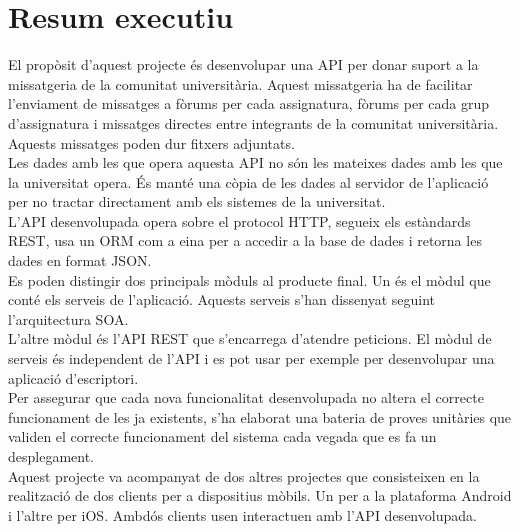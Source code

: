 
\chapter{Resum executiu}
El propòsit d'aquest projecte és desenvolupar una \ac{API} per donar suport a la missatgeria de la comunitat universitària. Aquest missatgeria ha de facilitar l'enviament de missatges a fòrums per cada assignatura, fòrums per cada grup d'assignatura i missatges directes entre integrants de la comunitat universitària. Aquests missatges poden dur fitxers adjuntats. \\

Les dades amb les que opera aquesta \ac{API} no són les mateixes dades amb les que la universitat opera. És manté una còpia de les dades al servidor de l'aplicació per no tractar directament amb els sistemes de la universitat.\\

L'\ac{API} desenvolupada opera sobre el protocol \ac{HTTP}, segueix els estàndards \ac{REST}, usa un \ac{ORM} com a eina per a accedir a la base de dades i retorna les dades en format \ac{JSON}. \\

Es poden distingir dos principals mòduls al producte final. Un és el mòdul que conté els serveis de l'aplicació. Aquests serveis s'han dissenyat seguint l'arquitectura \ac{SOA}. \\

L'altre mòdul és l'\ac{API} \ac{REST} que s'encarrega d'atendre peticions. El mòdul de serveis és independent de l'\ac{API} i es pot usar per exemple per desenvolupar una aplicació d'escriptori.\\

Per assegurar que cada nova funcionalitat desenvolupada no altera el correcte funcionament de les ja existents, s'ha elaborat una bateria de proves unitàries que validen el correcte funcionament del sistema cada vegada que es fa un desplegament.\\

Aquest projecte va acompanyat de dos altres projectes que consisteixen en la realització de dos clients per a dispositius mòbils. Un per a la plataforma Android i l'altre per iOS. Ambdós clients usen interactuen amb l'\ac{API} desenvolupada.




